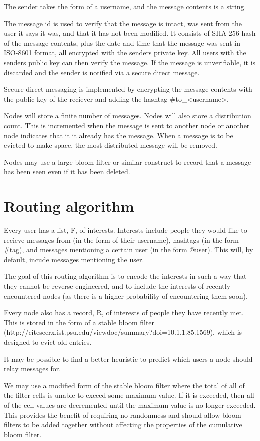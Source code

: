 \documentclass{article}
\begin{document}
The sender takes the form of a username, and the message contents is a string.

The message id is used to verify that the message is intact, was sent from the user it says it was, and that it has not been modified. It consists of SHA-256 hash of the message contents, plus the date and time that the message was sent in ISO-8601 format, all encrypted with the senders private key. All users with the senders public key can then verify the message. If the message is unverifiable, it is discarded and the sender is notified via a secure direct message.

Secure direct messaging is implemented by encrypting the message contents with the public key of the reciever and adding the hashtag \#to\_\textless username\textgreater.


Nodes will store a finite number of messages. Nodes will also store a distribution count. This is incremented when the message is sent to another node or another node indicates that it it already has the message. When a message is to be evicted to make space, the most distributed message will be removed.

Nodes may use a large bloom filter or similar construct to record that a message has been seen even if it has been deleted.

\section*{Routing algorithm}
Every user has a list, F, of interests. Interests include people they would like to recieve messages from (in the form of their username), hashtags (in the form \#tag), and messages mentioning a certain user (in the form @user). This will, by default, incude messages mentioning the user.

The goal of this routing algorithm is to encode the interests in such a way that they cannot be reverse engineered, and to include the interests of recently encountered nodes (as there is a higher probability of encountering them soon).

Every node also has a record, R, of interests of people they have recently met. This is stored in the form of a stable bloom filter (http://citeseerx.ist.psu.edu/viewdoc/summary?doi=10.1.1.85.1569), which is designed to evict old entries.

It may be possible to find a better heuristic to predict which users a node should relay messages for.

We may use a modified form of the stable bloom filter where the total of all of the filter cells is unable to exceed some maximum value. If it is exceeded, then all of the cell values are decremented until the maximum value is no longer exceeded. This provides the benefit of requiring no randomness and should allow bloom filters to be added together without affecting the properties of the cumulative bloom filter.
\end{document}
